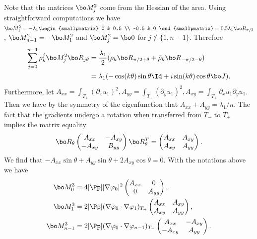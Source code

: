 Note that the matrices $\bo M_j^2$ come from the Hessian of the area. Using straightforward computations we have $\bo M_1^2 = -\lambda_1 \begin{smallpmatrix}
0 & 0.5 \\
-0.5 & 0
\end{smallpmatrix}=0.5\lambda_1 \bo R_{\pi/2}$, $\bo M_{n-1}^2 = -\bo M_1^2$ and $\bo M_j^2 = \bo 0$ for $j\notin\{1,n-1\}$. Therefore
\begin{align*}
\sum_{j=0}^{n-1} \rho_k^j\bo M_j^2 \bo R_{j\theta} &= \frac{\lambda_1}{2} (\rho_k\bo R_{\pi/2+\theta}+\bar \rho_k \bo R_{-\pi/2-\theta})\\
&=\lambda_1 (-\cos(k\theta) \sin \theta \Id+ i \sin(k\theta) \cos \theta \bo J).
\end{align*}
Furthermore, let $A_{xx} = \int_{T_+} (\partial_x u_1)^2, A_{yy} = \int_{T_+} (\partial_y u_1)^2, A_{xy} = \int_{T_+} \partial_x u_1 \partial_y u_1$. Then we have by the symmetry of the eigenfunction that $A_{xx}+A_{yy} = \lambda_1/n$. The fact that the gradients undergo a rotation when transferred from $T_-$ to $T_+$ implies the matrix equality
\begin{equation}
\bo R_\theta\begin{pmatrix}
A_{xx} & -A_{xy} \\
-A_{xy} & B_{yy}
\end{pmatrix}
\bo R_\theta^T
=
\begin{pmatrix}
A_{xx} & A_{xy} \\
A_{xy} & A_{yy}
\end{pmatrix}.
\label{eq:relation-rotation-gradients}
\end{equation}
We find that $-A_{xx}\sin \theta + A_{yy} \sin \theta + 2A_{xy} \cos \theta = 0$. With the notations above we have
\begin{align*}
\bo M_0^3 &= 4 |\Pp| |\nabla \varphi_0|^2 \begin{pmatrix}
A_{xx} & 0 \\
0 & A_{yy}
\end{pmatrix},\\
\bo M_1^3 &= 2 |\Pp| (\nabla \varphi_0 \cdot \nabla \varphi_1)_{T_+} \begin{pmatrix}
A_{xx} & A_{xy} \\
A_{xy} & A_{yy}
\end{pmatrix},
\\
\bo M_{n-1}^3 &= 2 |\Pp| (\nabla \varphi_0 \cdot \nabla \varphi_{n-1})_{T_-} \begin{pmatrix}
A_{xx} & -A_{xy} \\
-A_{xy} & A_{yy}
\end{pmatrix}.
\end{align*}
